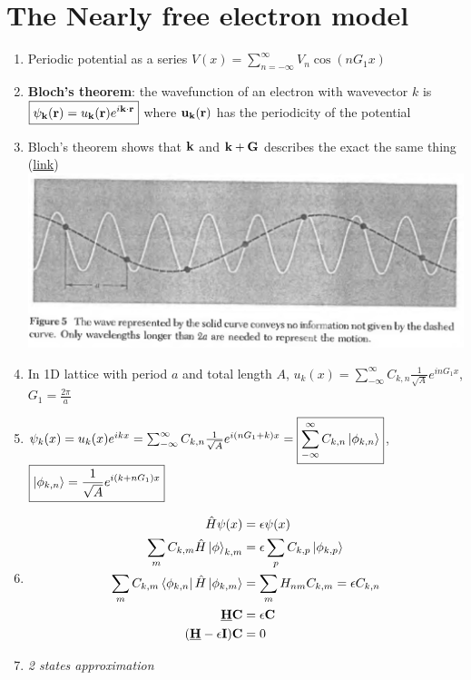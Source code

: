 \documentclass{article}
\theoremstyle{remark}
\theoremstyle{remark}
\begin{document}
\section*{The Nearly free electron model}
\begin{enumerate}
    \item Periodic potential as a series $V(x)=\sum_{n=-\infty}^{\infty}V_n\cos(nG_1x)$
    \item \textbf{Bloch's theorem}: the wavefunction of an electron with wavevector $k$ is $\boxed{\vb{\psi}_{\vb{k}}(\vb{r})=u_{\vb{k}}(\vb{r})e^{i\vb{k}\cdot\vb{r}}}$ where $\vb{u}_{\vb{k}}(\vb{r})$ has the periodicity of the potential
    \item Bloch's theorem shows that $\vb{k}$ and $\vb{k+G}$ describes the exact the same thing (\href{https://physics.stackexchange.com/questions/243946/physical-meaning-of-crystal-momentum}{link})\newline
            \includegraphics*[width=0.6\linewidth]{cmp_k&k+G.png}
    \item In 1D lattice with period $a$ and total length $A$, $u_k(x)=\sum_{-\infty}^{\infty}C_{k,n}\frac{1}{\sqrt{A}}e^{inG_1x}$, $G_1=\frac{2\pi}{a}$
    \item $\psi_k(x) = u_k(x)e^{ikx} = \sum_{-\infty}^{\infty}C_{k,n}\frac{1}{\sqrt{A}}e^{i(nG_1+k)x} = \boxed{\sum_{-\infty}^{\infty}C_{k,n}\ket{\phi_{k,n}}}$, $\boxed{\ket{\phi_{k,n}}=\frac{1}{\sqrt{A}}e^{i(k+nG_1)x}}$
    \item \begin{align*}
            \hat{H}\psi(x) &= \epsilon\psi(x)\\
            \sum_{m}C_{k,m}\hat{H}\ket{\phi}_{k,m} &= \epsilon\sum_p C_{k,p}\ket{\phi_{k,p}}\\
            \sum_m C_{k,m}\bra{\phi_{k,n}}\hat{H}\ket{\phi_{k,m}} &= \sum_m H_{nm}C_{k,m} = \epsilon C_{k,n}\\
            \underline{\vb{H}}\vb{C} &= \epsilon\vb{C}\\
            (\underline{\vb{H}}-\epsilon\vb{I})\vb{C} &= 0
        \end{align*}
    \item \emph{2 states approximation}\begin{itemize}

\end{itemize}
\end{enumerate}
\end{document}
